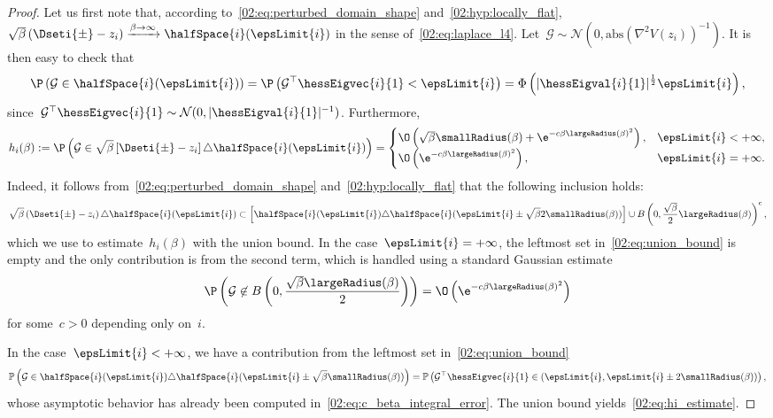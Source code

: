 \begin{proof}
            Let us first note that, according to~\eqref{02:eq:perturbed_domain_shape} and~\eqref{02:hyp:locally_flat},~$\sqrt\beta\left(\Dseti{\pm}-z_i\right)\xrightarrow{\beta\to\infty}\halfSpace{i}(\epsLimit{i})$ in the sense of~\eqref{02:eq:laplace_l4}.
            Let~$\mathcal G\sim \mathcal N\left(0,\mathrm{abs}\left(\nabla^2 V(z_i)\right)^{-1}\right)$.  
            It is then easy to check that
            \[\P\left(\mathcal G \in \halfSpace{i}(\epsLimit{i})\right)=\P\left(\mathcal G^\top\hessEigvec{i}{1}<\epsLimit{i}\right)=\Phi\left(|\hessEigval{i}{1}|^{\frac12}\epsLimit{i}\right),\]
            since~$\mathcal G^\top\hessEigvec{i}{1}\sim \mathcal N(0,|\hessEigval{i}{1}|^{-1})$. Furthermore,
            \begin{equation}
                \label{02:eq:hi_estimate}
                h_i(\beta):=\P\left(\mathcal G \in \sqrt\beta\left[\Dseti{\pm}-z_i\right] \triangle \halfSpace{i}(\epsLimit{i})\right) = \begin{cases}
                    \O\left(\sqrt\beta\smallRadius(\beta)+\e^{-c\beta\largeRadius(\beta)^2}\right),& \epsLimit{i}< +\infty,\\
                    \O\left(\e^{-c\beta\largeRadius(\beta)^2}\right),&\epsLimit{i} = +\infty.
                \end{cases}
            \end{equation}
            Indeed, it follows from~\eqref{02:eq:perturbed_domain_shape} and~\eqref{02:hyp:locally_flat} that the following inclusion holds:
            \begin{equation}
                \label{02:eq:union_bound}
                \sqrt\beta\left(\Dseti{\pm}-z_i\right)\triangle \halfSpace{i}(\epsLimit{i})\subset \left[\halfSpace{i}(\epsLimit{i})\triangle\halfSpace{i}(\epsLimit{i}\pm\sqrt\beta2\smallRadius(\beta))\right]\cup B\left(0,\frac{\sqrt\beta}{2}\largeRadius(\beta)\right)^{\mathrm c},
            \end{equation}
             which we use to estimate~$h_i(\beta)$ with the union bound. In the case~$\epsLimit{i}=+\infty$, the leftmost set in~\eqref{02:eq:union_bound} is empty and the only contribution is from the second term, which is handled using a standard Gaussian estimate
            $$\P\left(\mathcal G \not\in B\left(0,\frac{\sqrt\beta\largeRadius(\beta)}2\right)\right) = \O\left(\e^{-c\beta\largeRadius(\beta)^2}\right)$$ for some~$c>0$ depending only on~$i$.

            In the case~$\epsLimit{i}<+\infty$, we have a contribution from the leftmost set in~\eqref{02:eq:union_bound}
            \[\mathbb P\left(\mathcal G\in \halfSpace{i}(\epsLimit{i})\triangle\halfSpace{i}(\epsLimit{i}\pm\sqrt\beta\smallRadius(\beta))\right) = \mathbb P\left(\mathcal G^\top\hessEigvec{i}{1}\in \left(\epsLimit{i},\epsLimit{i}\pm2\smallRadius(\beta)\right)\right),\]
            whose asymptotic behavior has already been computed in~\eqref{02:eq:c_beta_integral_error}. The union bound yields~\eqref{02:eq:hi_estimate}.
            

\end{proof}
